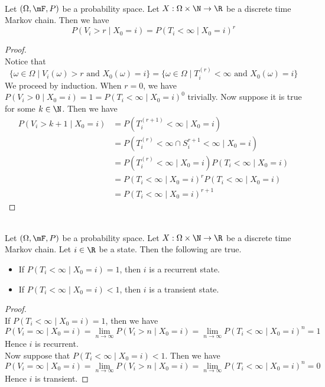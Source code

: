 \documentclass[a4paper]{article}
\begin{document}
\begin{lmm}{}{}\\
Let $(\Omega,\mF,P)$ be a probability space. Let $X:\Omega\times\N\to\R$ be a discrete time Markov chain. Then we have $$P(V_i>r\;|\;X_0=i)=P(T_i<\infty\;|\;X_0=i)^r$$
\begin{proof}\\
Notice that $$\{\omega\in\Omega\;|\;V_i(\omega)>r\text{ and }X_0(\omega)=i\}=\{\omega\in\Omega\;|\;T_i^{(r)}<\infty\text{ and }X_0(\omega)=i\}$$ We proceed by induction. When $r=0$, we have $P(V_i>0\;|\;X_0=i)=1=P(T_i<\infty\;|\;X_0=i)^0$ trivially. Now suppose it is true for some $k\in\N$. Then we have
\begin{align*}
P(V_i>k+1\;|\;X_0=i)&=P(T_i^{(r+1)}<\infty\;|\;X_0=i)\\
&=P(T_i^{(r)}<\infty\cap S_i^{r+1}<\infty\;|\;X_0=i)\\
&=P(T_i^{(r)}<\infty\;|\;X_0=i)P(T_i<\infty\;|\;X_0=i)\\
&=P(T_i<\infty\;|\;X_0=i)^rP(T_i<\infty\;|\;X_0=i)\\
&=P(T_i<\infty\;|\;X_0=i)^{r+1}
\end{align*}
\end{proof}
\end{lmm}

\begin{prp}{}{}\\
Let $(\Omega,\mF,P)$ be a probability space. Let $X:\Omega\times\N\to\R$ be a discrete time Markov chain. Let $i\in\R$ be a state. Then the following are true. 
\begin{itemize}
\item If $P(T_i<\infty\;|\;X_0=i)=1$, then $i$ is a recurrent state. 
\item If $P(T_i<\infty\;|\;X_0=i)<1$, then $i$ is a transient state. 
\end{itemize}
\begin{proof}\\
If $P(T_i<\infty\;|\;X_0=i)=1$, then we have $$P(V_i=\infty\;|\;X_0=i)=\lim_{n\to\infty}P(V_i>n\;|\;X_0=i)=\lim_{n\to\infty}P(T_i<\infty\;|\;X_0=i)^n=1$$ Hence $i$ is recurrent. \\

Now suppose that $P(T_i<\infty\;|\;X_0=i)<1$. Then we have $$P(V_i=\infty\;|\;X_0=i)=\lim_{n\to\infty}P(V_i>n\;|\;X_0=i)=\lim_{n\to\infty}P(T_i<\infty\;|\;X_0=i)^n=0$$ Hence $i$ is transient. 
\end{proof}
\end{prp}
\end{document}
